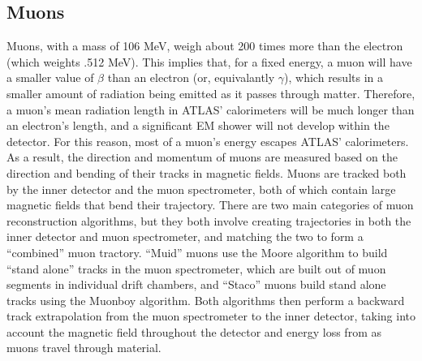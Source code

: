 \subsection{Muons}
Muons, with a mass of 106 MeV, weigh about 200 times more than the electron (which weights .512 MeV).
This implies that, for a fixed energy, a muon will have a smaller value of $\beta$ than an electron (or, equivalantly $\gamma$), which results in a smaller amount of radiation being emitted as it passes through matter.
Therefore, a muon's mean radiation length in ATLAS' calorimeters will be much longer than an electron's length, and a significant EM shower will not develop within the detector.
For this reason, most of a muon's energy escapes ATLAS' calorimeters.
As a result, the direction and momentum of muons are measured based on the direction and bending of their tracks in magnetic fields.
Muons are tracked both by the inner detector and the muon spectrometer, both of which contain large magnetic fields that bend their trajectory.
There are two main categories of muon reconstruction algorithms, but they both involve creating trajectories in both the inner detector and muon spectrometer, and matching the two to form a ``combined'' muon tractory.
``Muid'' muons use the Moore algorithm to build ``stand alone'' tracks in the muon spectrometer, which are built out of muon segments in individual drift chambers, and ``Staco'' muons build stand alone tracks using the Muonboy algorithm.
Both algorithms then perform a backward track extrapolation from the muon spectrometer to the inner detector, taking into account the magnetic field throughout the detector and energy loss from as muons travel through material.
 


